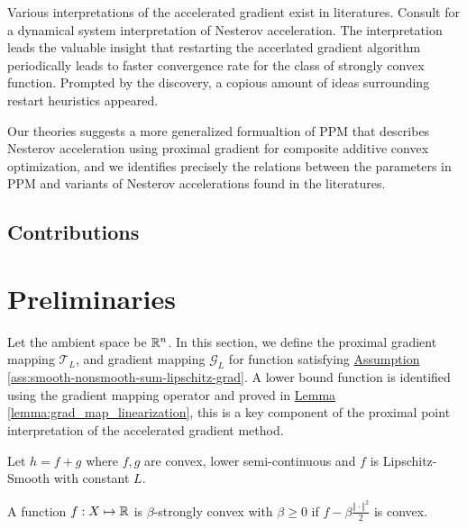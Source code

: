 \documentclass[12pt]{article}
\begin{document}
        \par
        Various interpretations of the accelerated gradient exist in literatures. 
        Consult \cite{su_differential_2016} for a dynamical system interpretation of Nesterov acceleration. 
        The interpretation leads the valuable insight that restarting the accerlated gradient algorithm periodically leads to faster convergence rate for the class of strongly convex function. 
        Prompted by the discovery, a copious amount of ideas surrounding restart heuristics appeared. 

        Our theories suggests a more generalized formualtion of PPM that describes Nesterov acceleration using proximal gradient for composite additive convex optimization, and we identifies precisely the relations between the parameters in PPM and variants of Nesterov accelerations found in the literatures. 

    \subsection{Contributions}

    
\section{Preliminaries}\label{sec:preliminaries}
    Let the ambient space be $\mathbb R^n$. 
    In this section, we define the proximal gradient mapping $\mathcal T_L$, and gradient mapping $\mathcal G_L$ for function satisfying 
    \hyperref[ass:smooth-nonsmooth-sum-lipschitz-grad]
    {Assumption \ref*{ass:smooth-nonsmooth-sum-lipschitz-grad}}. 
    A lower bound function is identified using the gradient mapping operator and proved in
    \hyperref[lemma:grad_map_linearization]{Lemma \ref*{lemma:grad_map_linearization}}, 
    this is a key component of the proximal point interpretation of the accelerated gradient method. 
    \begin{assumption}\label{ass:smooth-nonsmooth-sum-lipschitz-grad}
        Let $h = f + g$ where $f, g$ are convex, lower semi-continuous and $f$ is Lipschitz-Smooth with constant $L$. 
    \end{assumption}
    \begin{definition}
        A function $f: X \mapsto \mathbb R$ is $\beta$-strongly convex
        with $\beta\geq 0$ if $f - \beta \frac{\Vert \cdot\Vert^2}{2}$ is convex.
    \end{definition}
\end{document}
